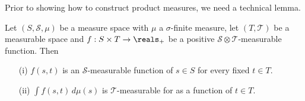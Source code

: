 Prior to showing how to construct product measures, we need a
technical lemma.
\begin{lem}\label{MeasurableSections}Let $(S, \mathcal{S}, \mu)$ be a measure space with $\mu$ a
  $\sigma$-finite measure, let $(T, \mathcal{T})$ be a measurable
  space and $f : S \times T \to \reals_+$ be a positive $\mathcal{S} \otimes \mathcal{T} $-measurable
  function.  Then
\begin{itemize}
\item[(i)]$f(s,t)$ is an $\mathcal{S}$-measurable function of $s \in
  S$ for every fixed $t \in T$.
\item[(ii)] $\int f(s,t) \,  d \mu(s)$ is $\mathcal{T}$-measurable for
  as a function of $t \in T$.
\end{itemize}
\end{lem}
